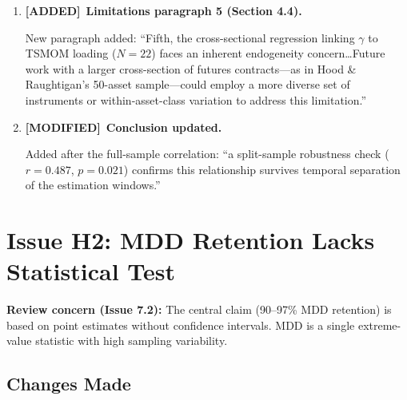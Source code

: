 \documentclass[12pt,a4paper]{article}
\newcommand{\ADDED}{\textcolor{added}{\textbf{[ADDED]}}}
\newcommand{\MODIFIED}{\textcolor{modified}{\textbf{[MODIFIED]}}}
\begin{document}
\begin{enumerate}[label=\arabic*.]
\item \ADDED\ \textbf{Limitations paragraph 5 (Section 4.4).}

New paragraph added: ``Fifth, the cross-sectional regression linking $\gamma$ to TSMOM loading ($N = 22$) faces an inherent endogeneity concern\ldots Future work with a larger cross-section of futures contracts---as in Hood \& Raughtigan's 50-asset sample---could employ a more diverse set of instruments or within-asset-class variation to address this limitation.''

\item \MODIFIED\ \textbf{Conclusion updated.}

Added after the full-sample correlation: ``a split-sample robustness check ($r = 0.487$, $p = 0.021$) confirms this relationship survives temporal separation of the estimation windows.''

\end{enumerate}


\section{Issue H2: MDD Retention Lacks Statistical Test}

\noindent\textbf{Review concern (Issue 7.2):} The central claim (90--97\% MDD retention) is based on point estimates without confidence intervals. MDD is a single extreme-value statistic with high sampling variability.

\subsection{Changes Made}
\end{document}
